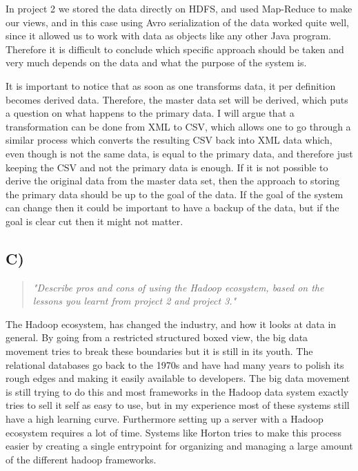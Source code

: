 In project 2 we stored the data directly on HDFS, and used Map-Reduce to make our views, and in this case using Avro serialization of the data worked quite well, since it allowed us to work with data as objects like any other Java program. Therefore it is difficult to conclude which specific approach should be taken and very much depends on the data and what the purpose of the system is.

It is important to notice that as soon as one transforms data, it per definition becomes derived data. Therefore, the master data set will be derived, which puts a question on what happens to the primary data. I will argue that a transformation can be done from XML to CSV, which allows one to go through a similar process which converts the resulting CSV back into XML data which, even though is not the same data, is equal to the primary data, and therefore just keeping the CSV and not the primary data is enough. If it is not possible to derive the original data from the master data set, then the approach to storing the primary data should be up to the goal of the data. If the goal of the system can change then it could be important to have a backup of the data, but if the goal is clear cut then it might not matter.

\subsection{C)}
\begin{quote}
	\textit{"Describe	pros	and	cons	of	using	the	Hadoop	ecosystem,	based	on	the	lessons	you	learnt	from	project	2	and	project	3."}
\end{quote}

The Hadoop ecosystem, has changed the industry, and how it looks at data in general. By going from a restricted structured boxed view, the big data movement tries to break these boundaries but it is still in its youth. The relational databases go back to the 1970s and have had many years to polish its rough edges and making it easily available to developers. The big data movement is still trying to do this and most frameworks in the Hadoop data system exactly tries to sell it self as easy to use, but in my experience most of these systems still have a high learning curve. Furthermore setting up a server with a Hadoop ecosystem requires a lot of time. Systems like Horton tries to make this process easier by creating a single entrypoint for organizing and managing a large amount of the different hadoop frameworks. 

